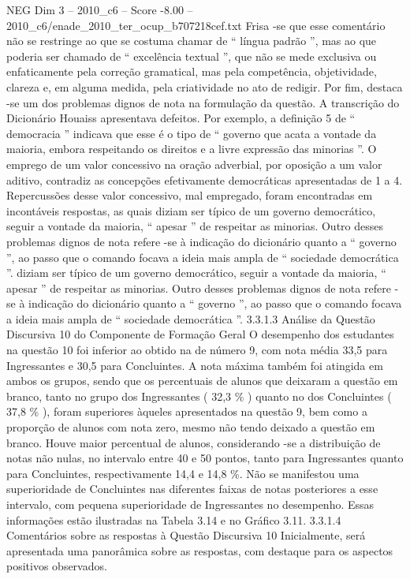 \begin{textsample}{NEG Dim 3 – 2010\_c6 – Score -8.00 – 2010\_c6/enade\_2010\_ter\_ocup\_b707218cef.txt}
Frisa -se que esse comentário não se restringe ao que se costuma chamar de “ língua padrão ”, mas ao que poderia ser chamado de “ excelência textual ”, que não se mede exclusiva ou enfaticamente pela correção gramatical, mas pela competência, objetividade, clareza e, em alguma medida, pela criatividade no ato de redigir.
Por fim, destaca -se um dos problemas dignos de nota na formulação da questão.
A transcrição do Dicionário Houaiss apresentava defeitos.
Por exemplo, a definição 5 de “ democracia ” indicava que esse é o tipo de “ governo que acata a vontade da maioria, embora respeitando os direitos e a livre expressão das minorias ”.
O emprego de um valor concessivo na oração adverbial, por oposição a um valor aditivo, contradiz as concepções efetivamente democráticas apresentadas de 1 a 4.
Repercussões desse valor concessivo, mal empregado, foram encontradas em incontáveis respostas, as quais diziam ser típico de um governo democrático, seguir a vontade da maioria, “ apesar ” de respeitar as minorias.
Outro desses problemas dignos de nota refere -se à indicação do dicionário quanto a “ governo ”, ao passo que o comando focava a ideia mais ampla de “ sociedade democrática ”. diziam ser típico de um governo democrático, seguir a vontade da maioria, “ apesar ” de respeitar as minorias.
Outro desses problemas dignos de nota refere -se à indicação do dicionário quanto a “ governo ”, ao passo que o comando focava a ideia mais ampla de “ sociedade democrática ”. 3.3.1.3 Análise da Questão Discursiva 10 do Componente de Formação Geral O desempenho dos estudantes na questão 10 foi inferior ao obtido na de número 9, com nota média 33,5 para Ingressantes e 30,5 para Concluintes.
A nota máxima também foi atingida em ambos os grupos, sendo que os percentuais de alunos que deixaram a questão em branco, tanto no grupo dos Ingressantes ( 32,3 \% ) quanto no dos Concluintes ( 37,8 \% ), foram superiores àqueles apresentados na questão 9, bem como a proporção de alunos com nota zero, mesmo não tendo deixado a questão em branco.
Houve maior percentual de alunos, considerando -se a distribuição de notas não nulas, no intervalo entre 40 e 50 pontos, tanto para Ingressantes quanto para Concluintes, respectivamente 14,4 e 14,8 \%.
Não se manifestou uma superioridade de Concluintes nas diferentes faixas de notas posteriores a esse intervalo, com pequena superioridade de Ingressantes no desempenho.
Essas informações estão ilustradas na Tabela 3.14 e no Gráfico 3.11. 3.3.1.4 Comentários sobre as respostas à Questão Discursiva 10 Inicialmente, será apresentada uma panorâmica sobre as respostas, com destaque para os aspectos positivos observados.

\end{textsample}
